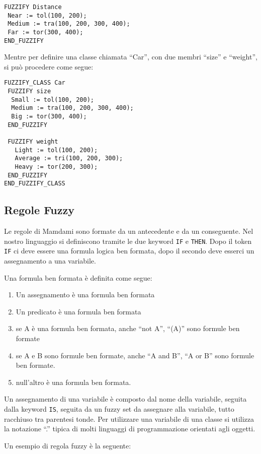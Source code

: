 \begin{lstlisting}[language=fuzzyKnowledgebase]
FUZZIFY Distance
 Near := tol(100, 200);
 Medium := tra(100, 200, 300, 400);
 Far := tor(300, 400);
END_FUZZIFY
\end{lstlisting}

Mentre per definire una classe chiamata ``Car'', con due membri ``size'' e ``weight'', si può procedere come segue:

\begin{lstlisting}[language=fuzzyKnowledgebase]
FUZZIFY_CLASS Car
 FUZZIFY size
  Small := tol(100, 200);
  Medium := tra(100, 200, 300, 400);
  Big := tor(300, 400);
 END_FUZZIFY
 
 FUZZIFY weight
   Light := tol(100, 200);
   Average := tri(100, 200, 300);
   Heavy := tor(200, 300);
 END_FUZZIFY
END_FUZZIFY_CLASS
\end{lstlisting}


\subsection{Regole Fuzzy}
Le regole di Mamdami sono formate da un antecedente e da un conseguente. Nel nostro linguaggio si definiscono tramite le due keyword \verb|IF| e \verb|THEN|.
Dopo il token \verb|IF| ci deve essere una formula logica ben formata, dopo il secondo deve esserci un assegnamento a una variabile.

Una formula ben formata è definita come segue:
\begin{enumerate}
 \item Un assegnamento è una formula ben formata
 \item Un predicato è una formula ben formata
 \item se A è una formula ben formata, anche ``not A'', ``(A)'' sono formule ben formate
 \item se A e B sono formule ben formate, anche ``A and B'', ``A or B'' sono formule ben formate.
 \item null'altro è una formula ben formata.
\end{enumerate}

Un assegnamento di una variabile è composto dal nome della variabile, seguita dalla keyword \verb|IS|, seguita da un fuzzy set da assegnare alla variabile, tutto racchiuso tra parentesi tonde. Per utilizzare una variabile di una classe si utilizza la notazione ``.'' tipica di molti linguaggi di programmazione orientati agli oggetti.

Un esempio di regola fuzzy è la seguente:

